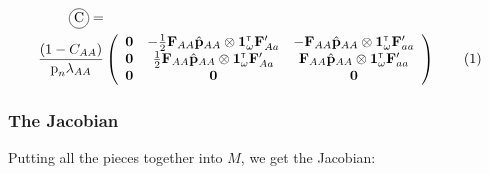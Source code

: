 \documentclass[11pt]{article}
\newcommand\encircle[1]{%
  \tikz[baseline=(X.base)] 
    \node (X) [draw, shape=circle, inner sep=0] {\strut #1};}
\newcommand\numberthis{\addtocounter{equation}{1}\tag{\theequation}}
\def\mbf#1{\mathbf{#1}}
\newcommand{\tr}{{\mbox{\tiny \sf T}}}
\begin{document}
{
\begin{align*}
	\encircle{C} =& \\
	\frac{(1 - C_{AA})}{\mbox{p}_{n}\lambda_{AA}} &\left(
			\begin{array}{ccc}
				\mbf{0}   & -\frac{1}{2} \mbf{F}_{AA} \hat{\mbf{p}}_{AA} \otimes \mathbf{1}^\tr_{\omega} \mathbf{F}_{Aa}^\prime&  - \mbf{F}_{AA} \hat{\mbf{p}}_{AA} \otimes \mathbf{1}^\tr_{\omega} \mathbf{F}_{aa}^\prime \\ 
						\mbf{0}   & \frac{1}{2} \mbf{F}_{AA} \hat{\mbf{p}}_{AA} \otimes \mathbf{1}^\tr_{\omega} \mathbf{F}_{Aa}^\prime&  \mbf{F}_{AA} \hat{\mbf{p}}_{AA}  \otimes \mathbf{1}^\tr_{\omega} \mathbf{F}_{aa}^\prime \\  
				\mbf{0} & \mbf{0} & \mbf{0} 
			\end{array} \right)  \numberthis			
\end{align*}
}




\subsubsection{The Jacobian}

Putting all the pieces together into $M$, we get the Jacobian:
\end{document}
